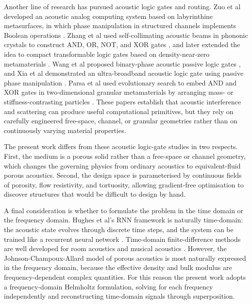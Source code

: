 Another line of research has pursued acoustic logic gates and routing. Zuo et al developed an acoustic analog computing system based on labyrinthine metasurfaces, in which phase manipulation in structured channels implements Boolean operations \cite{zuo2018acoustic}. Zhang et al used self-collimating acoustic beams in phononic crystals to construct AND, OR, NOT, and XOR gates \cite{zhang2015acoustic}, and later extended the idea to compact transformable logic gates based on density-near-zero metamaterials \cite{zhang2016compact}. Wang et al proposed binary-phase acoustic passive logic gates \cite{wang2019binary}, and Xia et al demonstrated an ultra-broadband acoustic logic gate using passive phase manipulation \cite{xia2026ultrabroadband}. Parsa et al used evolutionary search to embed AND and XOR gates in two-dimensional granular metamaterials by arranging mass- or stiffness-contrasting particles \cite{parsa2022evolution}. These papers establish that acoustic interference and scattering can produce useful computational primitives, but they rely on carefully engineered free-space, channel, or granular geometries rather than on continuously varying material properties.

The present work differs from these acoustic logic-gate studies in two respects. First, the medium is a porous solid rather than a free-space or channel geometry, which changes the governing physics from ordinary acoustics to equivalent-fluid porous acoustics. Second, the design space is parameterised by continuous fields of porosity, flow resistivity, and tortuosity, allowing gradient-free optimisation to discover structures that would be difficult to design by hand.

A final consideration is whether to formulate the problem in the time domain or the frequency domain. Hughes et al's RNN framework is naturally time-domain: the acoustic state evolves through discrete time steps, and the system can be trained like a recurrent neural network \cite{hughes2019wave}. Time-domain finite-difference methods are well developed for room acoustics and musical acoustics \cite{botteldooren1995finite, bilbao2009numerical, taflove2005computational, yee1966numerical}. However, the Johnson-Champoux-Allard model of porous acoustics is most naturally expressed in the frequency domain, because the effective density and bulk modulus are frequency-dependent complex quantities. For this reason the present work adopts a frequency-domain Helmholtz formulation, solving for each frequency independently and reconstructing time-domain signals through superposition.

